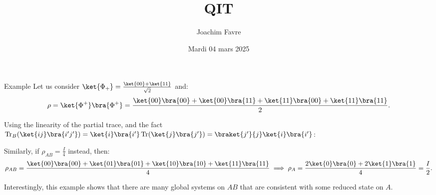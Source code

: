 \documentclass[a4paper]{article}
\title{QIT}
\author{Joachim Favre}
\date{Mardi 04 mars 2025}
\begin{document}
\maketitle


\begin{parag}{Example}
    Let us consider $\ket{\Phi_+} = \frac{\ket{00} + \ket{11}}{\sqrt{2}}$ and: 
    \[\rho = \ket{\Phi^+} \bra{\Phi^+} = \frac{\ket{00}\bra{00} + \ket{00}\bra{11} + \ket{11}\bra{00} + \ket{11}\bra{11}}{2}.\]

    Using the linearity of the partial trace, and the fact $\Tr_B\left(\ket{ij}\bra{i'j'}\right) = \ket{i}\bra{i'} \Tr\left(\ket{j}\bra{j'}\right) = \braket{j'}{j} \ket{i}\bra{i'}$: 

    Similarly, if $\rho_{AB} = \frac{I}{4}$ instead, then: 
    \[\rho_{AB} = \frac{\ket{00}\bra{00} + \ket{01}\bra{01} + \ket{10}\bra{10} + \ket{11}\bra{11}}{4} \implies \rho_A = \frac{2\ket{0}\bra{0} + 2\ket{1}\bra{1}}{4} = \frac{I}{2}.\]

    Interestingly, this example shows that there are many global systems on $AB$ that are consistent with some reduced state on $A$.
\end{parag}
\end{document}
